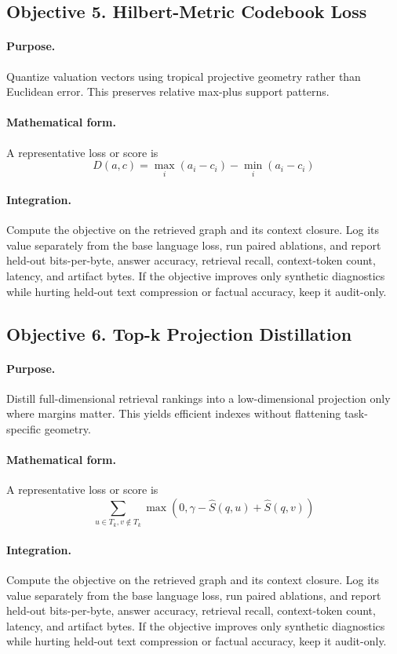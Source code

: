 \documentclass[11pt]{article}
\theoremstyle{definition}
\theoremstyle{remark}
\begin{document}
\subsection{Objective 5. Hilbert-Metric Codebook Loss}
\paragraph{Purpose.} Quantize valuation vectors using tropical projective geometry rather than Euclidean error. This preserves relative max-plus support patterns.

\paragraph{Mathematical form.} A representative loss or score is
\[
    D(a,c)=\max_i(a_i-c_i)-\min_i(a_i-c_i)
\]

\paragraph{Integration.} Compute the objective on the retrieved graph and its context closure. Log its value separately from the base language loss, run paired ablations, and report held-out bits-per-byte, answer accuracy, retrieval recall, context-token count, latency, and artifact bytes. If the objective improves only synthetic diagnostics while hurting held-out text compression or factual accuracy, keep it audit-only.


\subsection{Objective 6. Top-k Projection Distillation}
\paragraph{Purpose.} Distill full-dimensional retrieval rankings into a low-dimensional projection only where margins matter. This yields efficient indexes without flattening task-specific geometry.

\paragraph{Mathematical form.} A representative loss or score is
\[
    \sum_{u\in T_k,v\notin T_k}\max(0,\gamma-\hat S(q,u)+\hat S(q,v))
\]

\paragraph{Integration.} Compute the objective on the retrieved graph and its context closure. Log its value separately from the base language loss, run paired ablations, and report held-out bits-per-byte, answer accuracy, retrieval recall, context-token count, latency, and artifact bytes. If the objective improves only synthetic diagnostics while hurting held-out text compression or factual accuracy, keep it audit-only.
\end{document}
